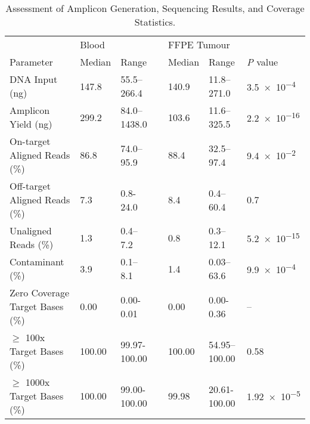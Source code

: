 \documentclass{bmcart}
\begin{document}
\begin{backmatter}
\begin{table}[H]
\caption{Assessment of Amplicon Generation, Sequencing Results, and Coverage Statistics.}\label{metrics}
      \begin{tabular}{lllllll}
        \hline
				\multicolumn{1}{l}{ }
				&
				\multicolumn{2}{l}{Blood}
				&&
				\multicolumn{2}{l}{FFPE Tumour}
				&
				\multicolumn{1}{l}{ } \\
				\cline{2-3}\cline{5-6}
        Parameter & Median & Range && Median & Range & \textit{P} value \\ \hline
				DNA Input (ng) & 147.8 & 55.5--266.4 && 140.9 & 11.8--271.0 & \num{3.5e-4} \\
				Amplicon Yield (ng) & 299.2 & 84.0--1438.0 && 103.6 & 11.6--325.5 & \num{2.2e-16} \\
				On-target Aligned Reads (\%) & 86.8 & 74.0--95.9 && 88.4 & 32.5--97.4 & \num{9.4e-2} \\
				Off-target Aligned Reads (\%) & 7.3 & 0.8-24.0 && 8.4 & 0.4--60.4 & \num{0.7} \\
				Unaligned Reads (\%) & 1.3 & 0.4--7.2 && 0.8 & 0.3--12.1 & \num{5.2e-15} \\
				Contaminant (\%) & 3.9 & 0.1--8.1 && 1.4 & 0.03--63.6 &
				\num{9.9e-4} \\
				Zero Coverage Target Bases (\%) & 0.00 & 0.00-0.01 && 0.00 & 0.00-0.36 &
				-- \\
				$\geq$ 100x Target Bases (\%) & 100.00 & 99.97-100.00 && 100.00 & 54.95--100.00 &
				\num{0.58} \\
				$\geq$ 1000x Target Bases (\%) & 100.00 & 99.00-100.00 && 99.98 & 20.61-100.00 & \num{1.92e-5} \\
				\hline
      \end{tabular} \\
\end{table}


\end{backmatter}
\end{document}
